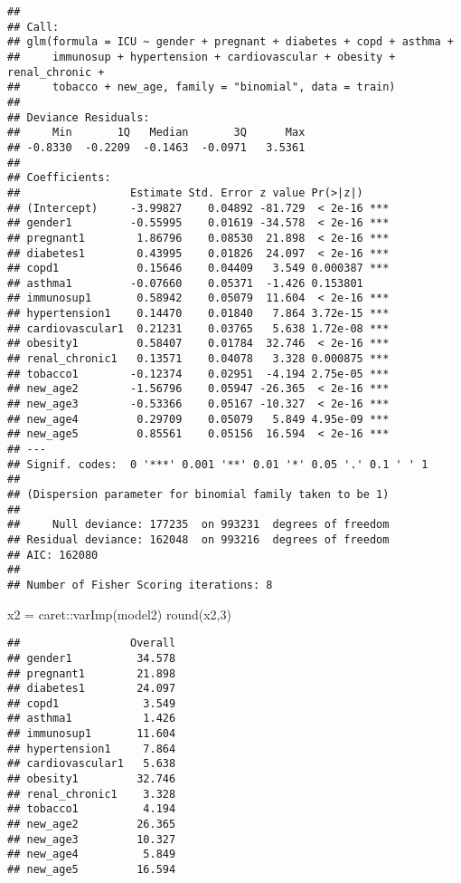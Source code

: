 \documentclass[
]{article}
\newenvironment{Shaded}{\begin{snugshade}}{\end{snugshade}}
\newcommand{\DecValTok}[1]{\textcolor[rgb]{0.00,0.00,0.81}{#1}}
\newcommand{\FunctionTok}[1]{\textcolor[rgb]{0.00,0.00,0.00}{#1}}
\newcommand{\NormalTok}[1]{#1}
\newcommand{\OtherTok}[1]{\textcolor[rgb]{0.56,0.35,0.01}{#1}}
\newcommand{\SpecialCharTok}[1]{\textcolor[rgb]{0.00,0.00,0.00}{#1}}
\begin{document}
\begin{verbatim}
## 
## Call:
## glm(formula = ICU ~ gender + pregnant + diabetes + copd + asthma + 
##     immunosup + hypertension + cardiovascular + obesity + renal_chronic + 
##     tobacco + new_age, family = "binomial", data = train)
## 
## Deviance Residuals: 
##     Min       1Q   Median       3Q      Max  
## -0.8330  -0.2209  -0.1463  -0.0971   3.5361  
## 
## Coefficients:
##                 Estimate Std. Error z value Pr(>|z|)    
## (Intercept)     -3.99827    0.04892 -81.729  < 2e-16 ***
## gender1         -0.55995    0.01619 -34.578  < 2e-16 ***
## pregnant1        1.86796    0.08530  21.898  < 2e-16 ***
## diabetes1        0.43995    0.01826  24.097  < 2e-16 ***
## copd1            0.15646    0.04409   3.549 0.000387 ***
## asthma1         -0.07660    0.05371  -1.426 0.153801    
## immunosup1       0.58942    0.05079  11.604  < 2e-16 ***
## hypertension1    0.14470    0.01840   7.864 3.72e-15 ***
## cardiovascular1  0.21231    0.03765   5.638 1.72e-08 ***
## obesity1         0.58407    0.01784  32.746  < 2e-16 ***
## renal_chronic1   0.13571    0.04078   3.328 0.000875 ***
## tobacco1        -0.12374    0.02951  -4.194 2.75e-05 ***
## new_age2        -1.56796    0.05947 -26.365  < 2e-16 ***
## new_age3        -0.53366    0.05167 -10.327  < 2e-16 ***
## new_age4         0.29709    0.05079   5.849 4.95e-09 ***
## new_age5         0.85561    0.05156  16.594  < 2e-16 ***
## ---
## Signif. codes:  0 '***' 0.001 '**' 0.01 '*' 0.05 '.' 0.1 ' ' 1
## 
## (Dispersion parameter for binomial family taken to be 1)
## 
##     Null deviance: 177235  on 993231  degrees of freedom
## Residual deviance: 162048  on 993216  degrees of freedom
## AIC: 162080
## 
## Number of Fisher Scoring iterations: 8
\end{verbatim}

\begin{Shaded}
\begin{Highlighting}[]
\NormalTok{x2 }\OtherTok{=}\NormalTok{ caret}\SpecialCharTok{::}\FunctionTok{varImp}\NormalTok{(model2)}
\FunctionTok{round}\NormalTok{(x2,}\DecValTok{3}\NormalTok{)}
\end{Highlighting}
\end{Shaded}

\begin{verbatim}
##                 Overall
## gender1          34.578
## pregnant1        21.898
## diabetes1        24.097
## copd1             3.549
## asthma1           1.426
## immunosup1       11.604
## hypertension1     7.864
## cardiovascular1   5.638
## obesity1         32.746
## renal_chronic1    3.328
## tobacco1          4.194
## new_age2         26.365
## new_age3         10.327
## new_age4          5.849
## new_age5         16.594
\end{verbatim}
\end{document}
